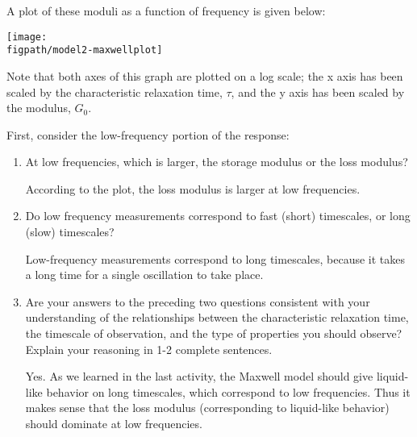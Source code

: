 \begin{activity}
\begin{model}
	A plot of these moduli as a function of frequency is given below:
			
		\vspace{0.1in}	
		\centerline{\texttt{[image: \\figpath/model2-maxwellplot]}}
	
	Note that both axes of this graph are plotted on a log scale; the x axis has been scaled by the characteristic relaxation time, $\tau$, and the y axis has been scaled by the modulus, $G_0$.
	
\end{model}

\begin{ctqs}
	
	\question First, consider the low-frequency portion of the response:
	
		\begin{enumerate}
		
			\item  At low frequencies, which is larger, the storage modulus or the loss modulus?
	
					\begin{solution}[1in]
					
						According to the plot, the loss modulus is larger at low frequencies.
					
					\end{solution}
					
			\item Do low frequency measurements correspond to fast (short) timescales, or long (slow) timescales?
			
				\begin{solution}[1in]
				
					Low-frequency measurements correspond to long timescales, because it takes a long time for a single oscillation to take place.
				
				\end{solution}
					
			\item Are your answers to the preceding two questions consistent with your understanding of the relationships between the characteristic relaxation time, the timescale of observation, and the type of properties you should observe?  Explain your reasoning in 1-2 complete sentences.
			
				\begin{solution}[2in]
				
					Yes. As we learned in the last activity, the Maxwell model should give liquid-like behavior on long timescales, which correspond to low frequencies.  Thus it makes sense that the loss modulus (corresponding to liquid-like behavior) should dominate at low frequencies.
				

\end{solution}
\end{enumerate}
\end{ctqs}
\end{activity}
